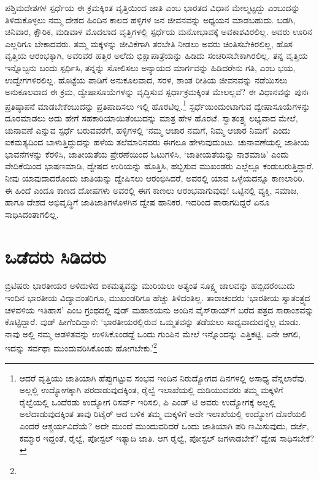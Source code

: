 ಪಶ್ಚಿಮದೇಶಗಳ ಸ್ಪರ್ಧೆಯ ಈ ಕ್ರಮಕ್ಕಿಂತ ವೃತ್ತಿಯಿಂದ ಜಾತಿ ಎಂಬ ಭಾರತದ ವಿಧಾನ ಮೇಲ್ಮಟ್ಟದ್ದು ಎಂಬುದನ್ನು ತಿಳಿದುಕೊಳ್ಳಲು ನಮ್ಮ ದೇಶದ ಹಿಂದಿನ ಕಾಲದ ಹಳ್ಳಿಗಳ ಜನ ಜೀವನವನ್ನು ಅಧ್ಯಯನ ಮಾಡಬಹುದು. ಬಡಗಿ, ಚಿನಿವಾರ, ಕ್ಷೌರಿಕ, ಮಡಿವಾಳ ಮೊದಲಾದ ವೃತ್ತಿಗಳಲ್ಲಿ ಸ್ಪರ್ಧೆಯ ಮನೋಭಾವಕ್ಕೆ ಅವಕಾಶವಿರಲಿಲ್ಲ. ಅವರು ಊರಿನ ಎಲ್ಲರಿಗೂ ಬೇಕಾದವರು. ತಮ್ಮ ಮಕ್ಕಳನ್ನು ಜೀವಿಕೆಗಾಗಿ ತರಬೇತಿ ನೀಡಲು ಅವರು ಚಿಂತಿಸಬೇಕಿರಲಿಲ್ಲ, ಹೊಸ ವೃತ್ತಿಯ ಆರಂಭಕ್ಕಾಗಿ, ಅವರಿವರ ಹತ್ತಿರ ಅಲೆದು ಭಿಕ್ಷಾಪಾತ್ರೆಯನ್ನು ಹಿಡಿದು ಸಂಚರಿಸಬೇಕಾಗಿರಲಿಲ್ಲ. ತನ್ನ ವೃತ್ತಿಯ ಇನ್ನೊಬ್ಬನು ಬಂದು ಸ್ಪರ್ಧಿಸಿ, ತನ್ನನ್ನು ಸೋಲಿಸಲು ಅನ್ಯಾಯದ ಮಾರ್ಗವನ್ನು ಹಿಡಿದರೇನು ಗತಿ, ಎಂಬ ಭಯ, ಉದ್ವೇಗಗಳಿರಲಿಲ್ಲ. ಹೊಟ್ಟೆಯ ಪಾಡಿಗೆ ಅನುಕೂಲವಾದ, ಸರಳ, ಶಾಂತ ರೀತಿಯ ಜೀವನವನ್ನು ನಡೆಯಿಸಲು ಅನುಕೂಲವಾದ ಈ ಕ್ರಮ, ದ್ವೇಷಾಸೂಯೆ\-ಗಳನ್ನು ವೃದ್ಧಿಸುವ ಸ್ಪರ್ಧಾಕ್ರಮಕ್ಕಿಂತ ಮೇಲಲ್ಲವೆ? ಈ ವಿಧಾನವನ್ನು ಪುನಃ ಪ್ರತಿಷ್ಠಾಪನೆ ಮಾಡಬೇಕೆಂಬುದನ್ನು ಪ್ರತಿಪಾದಿಸಲು ಇಲ್ಲಿ ಹೊರಟಿಲ್ಲ.\footnote{ಆದರೆ ವೃತ್ತಿಯು ಜಾತಿಯಾಗಿ ಹೆಪ್ಪುಗಟ್ಟುವ ಸಂಭವ ಇಂದಿನ ನಿರುದ್ಯೋಗದ ದಿನಗಳಲ್ಲಿ ಅಸಾಧ್ಯ ವೆನ್ನಲಾರೆವು. ಅಲ್ಲಲ್ಲಿ ಉದ್ಯೋಗಕ್ಕಾಗಿ ಪರದಾಡುವುದಕ್ಕಿಂತ, ರೈಲ್ವೆ ಇಲಾಖೆಯಲ್ಲಿ ದುಡಿಯುವವರು ತಮ್ಮ ಮಕ್ಕಳಿಗೆ ರೈಲ್ವೆಯಲ್ಲಿ ಒಂದೆರಡು ಉದ್ಯೋಗ ರಿಸರ್ವ್ ಇರಿಸಲಿ, ಪಿ ಎಂಡ್ ಟಿ ಅವರು ಉದ್ಯೋಗಕ್ಕೆ ಅಲ್ಲಲ್ಲಿ ಅಲೆದಾಡುವುದಕ್ಕಿಂತ ತಾವು ರಿಟೈರ್ ಆದ ಬಳಿಕ ತಮ್ಮ ಮಕ್ಕಳಿಗೆ ಅದೇ ಇಲಾಖೆಯಲ್ಲಿ ಉದ್ಯೋಗ ದೊರೆಯಲಿ ಎಂದರೆ ಆಶ್ಚರ್ಯವಿದೆಯೆ? ಅದೇ ಮುಂದೆ ಮುಂದುವರಿದರೆ ಒಂದು ಜಾತಿಯಾಗಿ ಪರಿ ಣಮಿಸುವುದು, ದರ್ಜೆ, ಕಮ್ಮಾರ ಇದ್ದಂತೆ, ರೈಲ್ವೆ, ಪೋಸ್ಟಲ್ ಇತ್ಯಾದಿ ಜಾತಿ. ಆಗ ರೈಲ್ವೆ, ಪೋಸ್ಟಲ್ ಜಗಳಾಡಬೇಕೆ? ದ್ವೇಷ ಸಾಧಿಸಬೇಕೆ?} ಸ್ಪರ್ಧೆಯಿಂದುಂಟಾಗುವ ದ್ವೇಷಾ\-ಸೂಯೆ\-ಗಳನ್ನು ದೂರಮಾಡಲು ಅದು ಹೇಗೆ ಸಹಕಾರಿಯಾಯಿತೆಂಬುದನ್ನು ಮಾತ್ರ ಹೇಳ ಹೊರಟೆ. ಸ್ವಾತಂತ್ರ್ಯ ಲಭ್ಯವಾದ ಮೇಲೆ, ಚುನಾವಣೆ ಎನ್ನುವ ಸ್ಪರ್ಧೆ ಬರುವವರೆಗೆ, ಹಳ್ಳಿಗಳಲ್ಲಿ ‘ನಮ್ಮ ಆಚಾರ ನಮಗೆ, ನಿಮ್ಮ ಆಚಾರ ನಿಮಗೆ’ ಎಂದು ಐಕಮತ್ಯದಿಂದ ಬಾಳುತ್ತಿದ್ದುದನ್ನು ಹಳೆಯ ತಲೆಮಾರಿನವರು ಈಗಲೂ ಹೇಳುವುದುಂಟು. ಚುನಾವಣೆಯಲ್ಲಿ ಜಾತೀಯ ಭಾವನೆಗಳನ್ನು ಕೆರಳಿಸಿ, ಜಾತೀಯತೆಯ ಪ್ರೇರಣೆಯಿಂದ ಓಟುಗಳಿಸಿ, ‘ಜಾತೀಯತೆಯನ್ನು ನಾಶಮಾಡಿ’ ಎಂದು ವೇದಿಕೆಯಿಂದ ಭಾಷಣಮಾಡಿ, ದ್ವೇಷದ ಉರಿಯನ್ನು ಹೊತ್ತಿಸಿ, ಹಬ್ಬಿಸುವ ಮುಖಂಡರು ಎಲ್ಲೆಲ್ಲೂ ಕಂಡುಬರುತ್ತಿದ್ದಾರೆ. ನೀವು ಯಾವುದಾದರೊಂದು ಜಾತಿಯನ್ನು ದ್ವೇಷಿಸಲು ಆರಂಭಿಸಿ\-ದರೆ, ಅವರಲ್ಲಿ ಯಾವ ಒಳ್ಳೆಯದನ್ನೂ ಕಾಣಲಾರಿರಿ. ಈ ಹಿಂದೆ ಎಂದೂ ಕಾಣದ ದೋಷಗಳು ಅವರಲ್ಲಿ ಈಗ ಕಾಣಲು ಆರಂಭವಾಗುವುವು! ಒಟ್ಟಿನಲ್ಲಿ ವ್ಯಕ್ತಿ, ಸಮಾಜ, ಹಾಗೂ ದೇಶದ ಅಭಿವೃದ್ಧಿಗೆ ಜಾತಿಜಾತಿಗಳೊಳಗಿನ ದ್ವೇಷ ಹಾನಿಕರ. ಇದರಿಂದ ಪಾರಾಗದಿದ್ದರೆ ಏನೂ ಸಾಧಿಸಿದಂತಾಗಲಿಲ್ಲ.


\section*{ಒಡೆದರು ಸಿಡಿದರು}


ಬ್ರಿಟಿಷರು ಭಾರತೀಯರ ಅಳಿದುಳಿದ ಐಕಮತ್ಯವನ್ನು ಮುರಿಯಲು ಅತ್ಯಂತ ಸೂಕ್ಷ್ಮ ಜಾಲವನ್ನು ಹಬ್ಬಿದರೆಂಬುದು ಇಂದಿನ ಭಾರತೀಯ ವಿದ್ಯಾವಂತರಿಗೂ, ಮುಖಂಡರಿಗೂ ಹೆಚ್ಚು ತಿಳಿದಂತಿಲ್ಲ. ತಾರಾಚಂದರು ‘ಭಾರತೀಯ ಸ್ವಾತಂತ್ರ್ಯದ ಚಳವಳಿಯ ಇತಿಹಾಸ’ ಎಂಬ ಗ್ರಂಥದಲ್ಲಿ ವುಡ್ ಮಹಾಶಯನು ಅಂದಿನ ವೈಸ್​ರಾಯ್​ಗೆ ಬರೆದ ಪತ್ರದ ಸಾರಾಂಶವನ್ನು ಕೊಟ್ಟಿದ್ದಾರೆ. ವುಡ್ ಹೀಗೆಂದಿದ್ದಾನೆ: ‘ಭಾರತೀಯರಲ್ಲಿರುವ ಒಮ್ಮತವನ್ನು ತಡೆಯಲು ಸಾಧ್ಯವಾದುದನ್ನೆಲ್ಲ ಮಾಡು. ನಾವು ಅಲ್ಲಿ ನಮ್ಮ ಆಡಳಿತವನ್ನು ಉಳಿಸಿಕೊಂಡದ್ದೆ ಒಂದು ಗುಂಪಿನ ಮೇಲೆ ಇನ್ನೊಂದನ್ನು ಎತ್ತಿಕಟ್ಟಿ. ಏನೇ ಆಗಲಿ, ಇದನ್ನು ಸರ್ವಥಾ ಮುಂದುವರಿಸಿಕೊಂಡು ಹೋಗಬೇಕು.’\footnote{}

